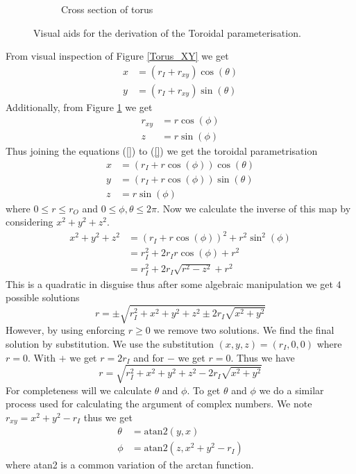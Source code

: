 \documentclass[12pt,a4paper]{article}
\begin{document}
\begin{figure}[H]
\begin{subfigure}{0.5\textwidth}
     \caption{Cross section of torus}
     \label{Torus_z}
 \end{subfigure}
 \caption{Visual aids for the derivation of the Toroidal parameterisation.} \label{BO}
\end{figure}

From visual inspection of Figure \ref{Torus_XY} we get 
\begin{align}
x &= (r_I + r_{xy})\cos(\theta)\\
y &= (r_I + r_{xy})\sin(\theta)
\end{align}
Additionally, from Figure \ref{Torus_z} we get 
\begin{align}
r_{xy}& = r \cos(\phi) \\
z &= r \sin(\phi)
\end{align}
Thus joining the equations (\ref{}) to (\ref{}) we get the toroidal parametrisation
\begin{align}
x &= (r_I + r\cos(\phi))\cos(\theta) \\
y &= (r_I + r \cos(\phi))\sin(\theta) \\
z &= r \sin(\phi)
\end{align}
where $0\leq r \leq r_O$ and $0 \leq \phi, \theta \leq 2 \pi$. Now we calculate the inverse of this map by considering $x^2 + y^2 + z^2$. 
\begin{align}
x^2 + y^2 + z^2 &= (r_I + r \cos(\phi))^2 + r^2\sin^2(\phi)\\
&= r_I^2 + 2r_Ir\cos(\phi) + r^2\\
&= r_I^2 +2r_I \sqrt{r^2-z^2} + r^2
\end{align}
This is a quadratic in disguise thus after some algebraic manipulation we get $4$ possible solutions
\begin{equation}
r = \pm\sqrt{r_I^2 + x^2 + y^2 + z^2 \pm 2r_I\sqrt{x^2+y^2}}
\end{equation}
However, by using enforcing $r\geq0$ we remove two solutions. We find the final solution by substitution. We use the substitution $(x, y, z) = (r_I, 0, 0)$ where $r=0$. With $+$ we get $r=2r_I$ and for $-$ we get $r = 0$. Thus we have 
\begin{equation}
r = \sqrt{r_I^2 + x^2 + y^2 + z^2 - 2r_I\sqrt{x^2+y^2}}
\end{equation}
For completeness will we calculate $\theta$ and $\phi$. To get $\theta$ and $\phi$ we do a similar process used for calculating the argument of complex numbers. We note $r_{xy}=x^2+y^2-r_I$ thus we get
\begin{align}
\theta &= \text{atan2}(y, x) \\
\phi &= \text{atan2}(z, x^2+y^2-r_{I})
\end{align}
where atan2 is a common variation of the arctan function.
\end{document}
